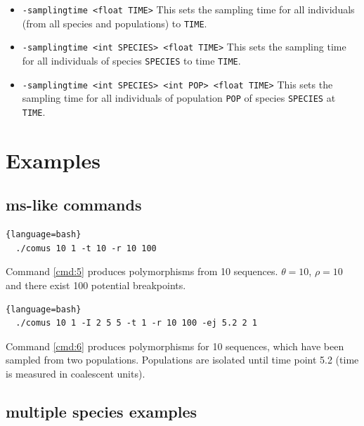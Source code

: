 \begin{itemize}
\item \verb!-samplingtime <float TIME>! This sets the sampling time for all individuals (from all species and populations) to \verb!TIME!. 
\item \verb!-samplingtime <int SPECIES> <float TIME>! This sets the sampling time for all individuals of species \verb!SPECIES! to time \verb!TIME!. 
\item \verb!-samplingtime <int SPECIES> <int POP> <float TIME>! This sets the sampling time for all individuals of population \verb!POP! of species \verb!SPECIES! at \verb!TIME!. 
\end{itemize}


\begin{figure}
\centering

\caption{}
\label{ancestral}

\end{figure}




\chapter{Examples}

\section{ms-like commands}

\begin{lstlisting}[label=cmd:5, caption={Simple ms command}]{language=bash}
  ./comus 10 1 -t 10 -r 10 100
\end{lstlisting}

Command \ref{cmd:5} produces polymorphisms from 10 sequences. $\theta = 10$, $\rho = 10$ and there exist 100 potential breakpoints. 


\begin{lstlisting}[label=cmd:6, caption={ms command with two populations}]{language=bash}
  ./comus 10 1 -I 2 5 5 -t 1 -r 10 100 -ej 5.2 2 1
\end{lstlisting}

Command \ref{cmd:6} produces polymorphisms for 10 sequences, which have been sampled from two populations. Populations are isolated until time point 5.2 (time is measured in coalescent units). 

\section{multiple species examples}

